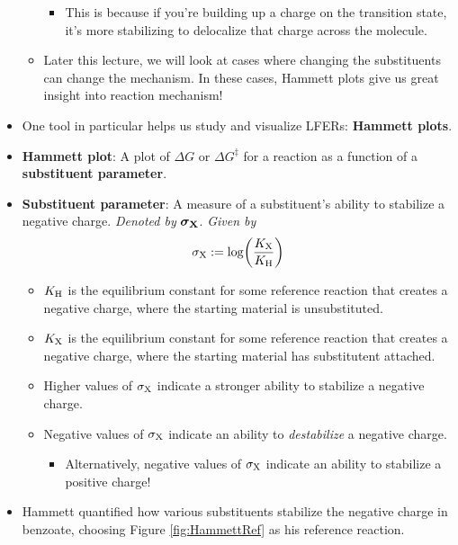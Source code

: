 \documentclass[../notes.tex]{subfiles}
\begin{document}
\begin{itemize}
\begin{itemize}
        \begin{itemize}
            \item This is because if you're building up a charge on the transition state, it's more stabilizing to delocalize that charge across the molecule.
        \end{itemize}
        \item Later this lecture, we will look at cases where changing the substituents can change the mechanism. In these cases, Hammett plots give us great insight into reaction mechanism!
    \end{itemize}
    \item One tool in particular helps us study and visualize LFERs: \textbf{Hammett plots}.
    \item \textbf{Hammett plot}: A plot of $\Delta G$ or $\Delta G^\ddagger$ for a reaction as a function of a \textbf{substituent parameter}.
    \item \textbf{Substituent parameter}: A measure of a substituent's ability to stabilize a negative charge. \emph{Denoted by} $\bm{\sigma_\textbf{\ce{X}}}$. \emph{Given by}
    \begin{equation*}
        \sigma_{\ce{X}} := \log(\frac{K_{\ce{X}}}{K_{\ce{H}}})
    \end{equation*}
    \begin{itemize}
        \item $K_{\ce{H}}$ is the equilibrium constant for some reference reaction that creates a negative charge, where the starting material is unsubstituted.
        \item $K_{\ce{X}}$ is the equilibrium constant for some reference reaction that creates a negative charge, where the starting material has substitutent  attached.
        \item Higher values of $\sigma_{\ce{X}}$ indicate a stronger ability to stabilize a negative charge.
        \item Negative values of $\sigma_{\ce{X}}$ indicate an ability to \emph{destabilize} a negative charge.
        \begin{itemize}
            \item Alternatively, negative values of $\sigma_{\ce{X}}$ indicate an ability to stabilize a positive charge!
        \end{itemize}
    \end{itemize}
    \item Hammett quantified how various substituents stabilize the negative charge in benzoate, choosing Figure \ref{fig:HammettRef} as his reference reaction.

\end{itemize}
\end{document}
